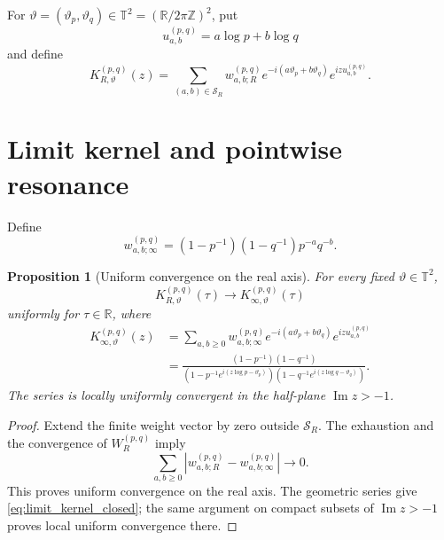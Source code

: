 \documentclass[11pt]{amsart}
\numberwithin{equation}{section}
\theoremstyle{plain}
\newtheorem{proposition}[theorem]{Proposition}
\theoremstyle{definition}
\theoremstyle{remark}
\newcommand{\Torus}{\mathbb T}
\begin{document}
For $\vartheta=(\vartheta_p,\vartheta_q)\in\Torus^2=(\mathbb R/2\pi\mathbb Z)^2$, put
\begin{equation}
u_{a,b}^{(p,q)}=a\log p+b\log q
\label{eq:uab}
\end{equation}
and define
\begin{equation}
K_{R,\vartheta}^{(p,q)}(z)
=
\sum_{(a,b)\in\mathcal S_R}
w_{a,b;R}^{(p,q)}
e^{-i(a\vartheta_p+b\vartheta_q)}
e^{izu_{a,b}^{(p,q)}}.
\label{eq:finite_kernel}
\end{equation}

\section{Limit kernel and pointwise resonance}
\label{sec:limit_kernel}

Define
\begin{equation}
w_{a,b;\infty}^{(p,q)}
=
(1-p^{-1})(1-q^{-1})p^{-a}q^{-b}.
\label{eq:limit_weights}
\end{equation}

\begin{proposition}[Uniform convergence on the real axis]
\label{prop:uniform_convergence}
For every fixed $\vartheta\in\Torus^2$,
\begin{equation}
K_{R,\vartheta}^{(p,q)}(\tau)
\longrightarrow
K_{\infty,\vartheta}^{(p,q)}(\tau)
\label{eq:uniform_kernel_limit}
\end{equation}
uniformly for $\tau\in\mathbb R$, where
\begin{align}
K_{\infty,\vartheta}^{(p,q)}(z)
&=
\sum_{a,b\geq0}
w_{a,b;\infty}^{(p,q)}
e^{-i(a\vartheta_p+b\vartheta_q)}
e^{izu_{a,b}^{(p,q)}}
\label{eq:limit_kernel_series}
\\
&=
\frac{(1-p^{-1})(1-q^{-1})}
{\left(1-p^{-1}e^{i(z\log p-\vartheta_p)}\right)
 \left(1-q^{-1}e^{i(z\log q-\vartheta_q)}\right)}.
\label{eq:limit_kernel_closed}
\end{align}
The series is locally uniformly convergent in the half-plane $\operatorname{Im}z>-1$.
\end{proposition}

\begin{proof}
Extend the finite weight vector by zero outside $\mathcal S_R$.  The exhaustion and the convergence of $W_R^{(p,q)}$ imply
\begin{equation}
\sum_{a,b\geq0}
\left|w_{a,b;R}^{(p,q)}-w_{a,b;\infty}^{(p,q)}\right|
\longrightarrow0.
\label{eq:l1_weight_convergence}
\end{equation}
This proves uniform convergence on the real axis.  The geometric series give \eqref{eq:limit_kernel_closed}; the same argument on compact subsets of $\operatorname{Im}z>-1$ proves local uniform convergence there.
\end{proof}
\end{document}
